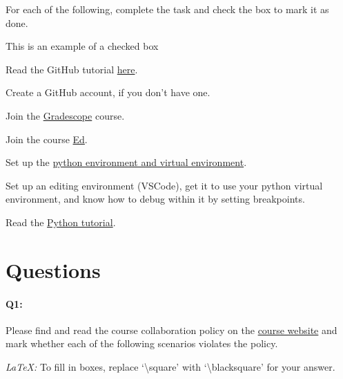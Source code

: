\documentclass[11pt]{article}
\newcommand{\cmark}{\ding{51}}%
\newcommand{\done}{\rlap{$\square$}{\raisebox{2pt}{\large\hspace{1pt}\cmark}}%
\hspace{-2.5pt}}
\begin{document}
For each of the following, complete the task and check the box to mark it as done.
\begin{todolist}
    \item[\done] This is an example of a checked box
    \item Read the GitHub tutorial \href{https://browncsci1430.github.io/webpage/resources/github_guide/}{here}.
    \item Create a GitHub account, if you don't have one.
    \item Join the \href{https://www.gradescope.com/}{Gradescope} course.
    \item Join the course \href{https://edstem.org/}{Ed}.
    \item Set up the \href{https://browncsci1430.github.io/webpage/resources/python_setup/}{python environment and virtual environment}.
    \item Set up an editing environment (VSCode), get it to use your python virtual environment, and know how to debug within it by setting breakpoints.
    \item Read the \href{https://browncsci1430.github.io/webpage/resources/python_tutorial/}{Python tutorial}.
\end{todolist}

\section*{Questions}

\paragraph{Q1:} Please find and read the course collaboration policy on the \href{http://cs.brown.edu/courses/csci1430/}{course website} and mark whether each of the following scenarios violates the policy.

\emph{LaTeX:} To fill in boxes, replace `\textbackslash square' with `\textbackslash blacksquare' for your answer.
\end{document}
